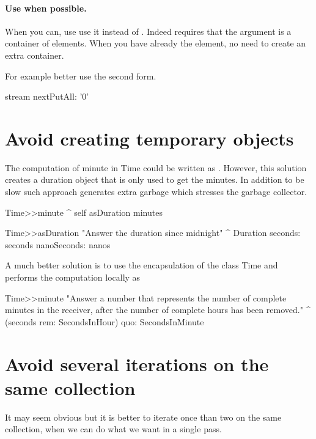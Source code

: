 \documentclass[a4paper,10pt,twoside]{book}
\begin{document}
\paragraph{Use  when possible.}
When you can, use  use it instead of . Indeed  requires that the argument is a container of elements. When you have already the element, no need to create an extra container.

For example better use the second form.
\begin{code}{}
stream nextPutAll: '0'
\end{code}



\section{Avoid creating temporary objects}

The computation of minute in Time could be written as . However, this solution
creates a duration object that is only used to get the minutes. 
In addition to be slow such approach generates extra garbage which stresses the garbage collector.

\begin{code}{}
Time>>minute
	^ self asDuration minutes
	
Time>>asDuration
	"Answer the duration since midnight"
	^ Duration seconds: seconds nanoSeconds: nanos 	
\end{code}

A much better solution is to use the encapsulation of the class Time and performs the computation locally as

\begin{code}{}
Time>>minute
	"Answer a number that represents the number of complete minutes in the receiver,
	after the number of complete hours has been removed."
	^ (seconds rem: SecondsInHour) quo: SecondsInMinute 
\end{code}

\section{Avoid several iterations on the same collection}
It may seem obvious but it is better to iterate once than two on the same collection, when we can do what we want in a single pass. 
\end{document}
